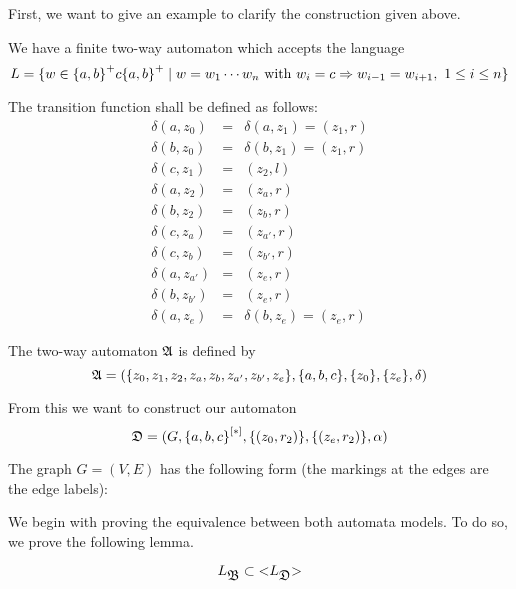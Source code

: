 \bigskip
First, we want to give an example to clarify the construction given above.

We have a finite two-way automaton which accepts the language
\[ L = \mbox{$\{w \in \mbox{$\{a, b\}$}^+ c \mbox{$\{a, b\}$}^+ \mid w = w_1 \cdots w_n
\text{ with } w_i = c \Rightarrow w_{i-1} = w_{i+1},\ 1 \leq i \leq n\}$} \]

The transition function shall be defined as follows:
\begin{eqnarray*}
\delta(a, z_0) &=& \delta(a, z_1) = (z_1, r) \\
\delta(b, z_0) &=& \delta(b, z_1) = (z_1, r) \\
\delta(c, z_1) &=& (z_2, l) \\
\delta(a, z_2) &=& (z_a, r) \\
\delta(b, z_2) &=& (z_b, r) \\
\delta(c, z_a) &=& (z_{a'}, r) \\
\delta(c, z_b) &=& (z_{b'}, r) \\
\delta(a, z_{a'}) &=& (z_e, r) \\
\delta(b, z_{b'}) &=& (z_e, r) \\
\delta(a, z_{e}) &=& \delta(b, z_e) = (z_e, r)
\end{eqnarray*}

The two-way automaton $\mbox{$\mathfrak{A}$}$ is defined by
\[ \mbox{$\mathfrak{A}$} = (\mbox{$\{z_0, z_1, z_2, z_a, z_b, z_{a'}, z_{b'}, z_e\}$}, \mbox{$\{a,
b, c\}$}, \mbox{$\{z_0\}$}, \mbox{$\{z_e\}$}, \delta) \]

From this we want to construct our automaton 
\[ \mbox{$\mathfrak{D}$} = (G, \mbox{${\mbox{$\{a, b, c\}$}}^{[*]}$}, \mbox{$\{(z_0, r_2)\}$}, \mbox{$\{(z_e,
r_2)\}$}, \alpha) \]

The graph $G = (V, E)$ has the following form (the markings at the edges are
the edge labels):

\missingfigure

We begin with proving the equivalence between both automata models. To do so, we
prove the following lemma.

\begin{lemma}
\[ L_{\mbox{$\mathfrak{B}$}} \subset \mbox{${<}{L_{\mbox{$\mathfrak{D}$}}}{>}$} \]
\end{lemma}

